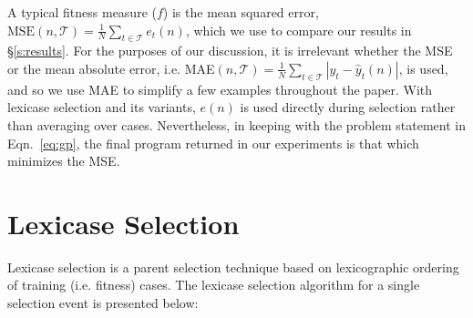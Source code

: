 \documentclass[twoside]{article}
\begin{document}
A typical fitness measure ($f$) is the mean squared error, $\text{MSE}(n,\mathcal{T}) = \frac{1}{N} \sum_{t \in \mathcal{T}}{e_t(n)}$, which we use to compare our results in \S\ref{s:results}. For the purposes of our discussion, it is irrelevant whether the MSE or the mean absolute error, i.e. MAE$(n,\mathcal{T}) = \frac{1}{N} \sum_{t \in \mathcal{T}}{|y_t - \hat{y}_t(n)|}$, is used, and so we use MAE to simplify a few examples throughout the paper. With lexicase selection and its variants, $e(n)$ is used directly during selection rather than averaging over cases. Nevertheless, in keeping with the problem statement in Eqn.~\ref{eq:gp}, the final program returned in our experiments is that which minimizes the MSE.

%

\section{Lexicase Selection}\label{s:lex}
Lexicase selection is a parent selection technique based on lexicographic ordering of training (i.e. fitness) cases. The lexicase selection algorithm for a single selection event is presented below: 
\end{document}
